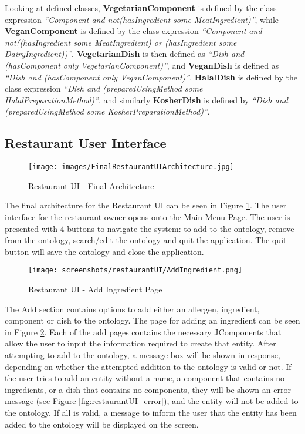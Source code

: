 Looking at defined classes, \textbf{VegetarianComponent} is defined by the class expression \textit{``Component and not(hasIngredient some MeatIngredient)''}, while \textbf{VeganComponent} is defined by the class expression \textit{``Component and not((hasIngredient some MeatIngredient) or (hasIngredient some DairyIngredient))''}. \textbf{VegetarianDish} is then defined as \textit{``Dish and (hasComponent only VegetarianComponent)''}, and \textbf{VeganDish} is defined as \textit{``Dish and (hasComponent only VeganComponent)''}. \textbf{HalalDish} is defined by the class expression \textit{``Dish and (preparedUsingMethod some HalalPreparationMethod)''}, and similarly \textbf{KosherDish} is defined by \textit{``Dish and (preparedUsingMethod some KosherPreparationMethod)''}.

\subsection{Restaurant User Interface}

\begin{figure}[h]
    \centering
    \captionsetup{justification=centering}
    \texttt{[image: images/FinalRestaurantUIArchitecture.jpg]}
    \caption{Restaurant UI - Final Architecture}
    \label{fig:restaurantUI_final_architecture}
\end{figure}

The final architecture for the Restaurant UI can be seen in Figure \ref{fig:restaurantUI_final_architecture}. The user interface for the restaurant owner opens onto the Main Menu Page. The user is presented with 4 buttons to navigate the system: to add to the ontology, remove from the ontology, search/edit the ontology and quit the application. The quit button will save the ontology and close the application.

\begin{figure}[h]
    \centering
    \captionsetup{justification=centering}
    \texttt{[image: screenshots/restaurantUI/AddIngredient.png]}
    \caption{Restaurant UI - Add Ingredient Page}
    \label{fig:restaurantUI_add_ing_page}
\end{figure}

The Add section contains options to add either an allergen, ingredient, component or dish to the ontology. The page for adding an ingredient can be seen in Figure \ref{fig:restaurantUI_add_ing_page}. Each of the add pages contains the necessary JComponents that allow the user to input the information required to create that entity. After attempting to add to the ontology, a message box will be shown in response, depending on whether the attempted addition to the ontology is valid or not. If the user tries to add an entity without a name, a component that contains no ingredients, or a dish that contains no components, they will be shown an error message (see Figure \ref{fig:restaurantUI_error}), and the entity will not be added to the ontology. If all is valid, a message to inform the user that the entity has been added to the ontology will be displayed on the screen.

